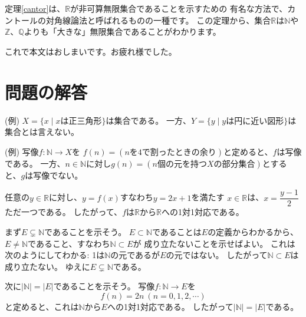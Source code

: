 \documentclass[./main]{subfiles} %
\theoremstyle{definition}
\begin{document}
定理\ref{cantor}は、$\mathbb{R}$が非可算無限集合であることを示すための
有名な方法で、カントールの対角線論法と呼ばれるものの一種です。
この定理から、集合$\mathbb{R}$は$\mathbb{N}$や
$\mathbb{Z}$、$\mathbb{Q}$よりも「大きな」無限集合であることがわかります。

これで本文はおしまいです。お疲れ様でした。

\section{問題の解答}
(例)
$X=\{x\mid xは正三角形\}$は集合である。
一方、$Y=\{y\mid yは円に近い図形\}$は集合とは言えない。

(例)
写像$f\colon\mathbb{N}\to X$を
$f(n)=(nを4で割ったときの余り)$と定めると、$f$は写像である。
一方、$n\in\mathbb{N}$に対し$g(n)=(n個の元を持つXの部分集合)$とすると、$g$は写像でない。

任意の$y\in\mathbb{R}$に対し、$y=f(x)$すなわち$y=2x+1$を満たす
$x\in\mathbb{R}$は、$x=\dfrac{y-1}{2}$ただ一つである。
したがって、$f$は$\mathbb{R}$から$\mathbb{R}$への1対1対応である。

まず$E\subsetneq\mathbb{N}$であることを示そう。
$E\subset\mathbb{N}$であることは$E$の定義からわかるから、
$E\neq\mathbb{N}$であること、すなわち$\mathbb{N}\subset E$が
成り立たないことを示せばよい。
これは次のようにしてわかる:
1は$\mathbb{N}$の元であるが$E$の元ではない。
したがって$\mathbb{N}\subset E$は成り立たない。
ゆえに$E\subsetneq\mathbb{N}$である。

次に$|\mathbb{N}|=|E|$であることを示そう。
写像$f\colon\mathbb{N}\to E$を
\[
f(n)=2n\ (n=0,1,2,\cdots)
\]
と定めると、これは$\mathbb{N}$から$E$への1対1対応である。
したがって$|\mathbb{N}|=|E|$である。
\end{document}
